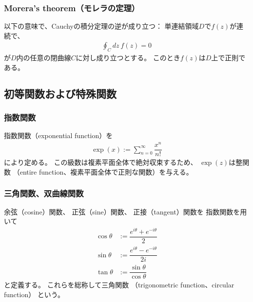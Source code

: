 \subsubsection{Morera's theorem（モレラの定理）}

以下の意味で、Cauchyの積分定理の逆が成り立つ：
単連結領域$D$で$f(z)$が連続で、
\begin{align}
    \oint_C dz\ f(z) = 0
\end{align}
が$D$内の任意の閉曲線$C$に対し成り立つとする。
このとき$f(z)$は$D$上で正則である。

\newpage
\subsection{初等関数および特殊関数}

\subsubsection{指数関数}

指数関数（exponential function）を
\begin{align}
    \exp(x)
    :=
    \sum_{n=0}^\infty
    \dfrac{x^n}{n!}
\end{align}
により定める。
この級数は複素平面全体で絶対収束するため、
$\exp(z)$は整関数
（entire function、複素平面全体で正則な関数）を与える。

\subsubsection{三角関数、双曲線関数}

余弦（cosine）関数、
正弦（sine）関数、
正接（tangent）関数を
指数関数を用いて
\begin{subequations}
\begin{align}
    \cos\theta &:= \dfrac{e^{i\theta} + e^{-i\theta}}{2}
\\
    \sin\theta &:= \dfrac{e^{i\theta} - e^{-i\theta}}{2i}
\\
    \tan\theta &:= \dfrac{\sin\theta}{\cos\theta}
\end{align}
\end{subequations}
と定義する。
これらを総称して三角関数
（trigonometric function、circular function）
という。

